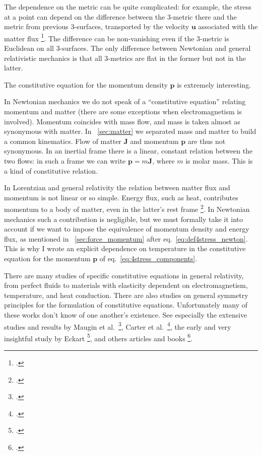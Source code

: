 \documentclass[\ifafour a4paper,12pt,\else a5paper,10pt,\fi%
onecolumn,oneside,article,%
british%
]{memoir}
\theoremstyle{remark}
\theoremstyle{innote}
\newcommand*{\citep}{\footcites}
\renewcommand*{\|}[1][]{\nonscript\,#1\vert\nonscript\;\mathopen{}}
\newcommand*{\eqn}{eq.}%
\newcommand*{\etal}{{et al.}}
\newcommand*{\puzzle}{{\fontencoding{U}\fontfamily{fontawesometwo}\selectfont\symbol{225}}}
\newcommand*{\psect}{{\footnotesize\puzzle}}%
\newcommand*{\ycc}{u}
\newcommand*{\yc}{\bm{\ycc}}
\newcommand*{\yjj}{J}
\newcommand*{\yj}{\bm{\yjj}}
\newcommand*{\ypp}{p}
\newcommand*{\yp}{\bm{\ypp}}
\begin{document}
The dependence on the metric can be quite complicated: for example, the
stress at a point can depend on the difference between the 3-metric there
and the metric from previous 3-surfaces, transported by the velocity $\yc$
associated with the matter flux \citep{grotetal1966,carteretal1972}. The
difference can be non-vanishing even if the 3-metric is Euclidean on all
3-surfaces. The only difference between Newtonian and general relativistic
mechanics is that all 3-metrics are flat in the former but not in the
latter.

\medskip

The constitutive equation for the momentum density $\yp$ is extremely
interesting.

In Newtonian mechanics we do not speak of a \enquote{constitutive equation}
relating momentum and matter (there are some exceptions when
electromagnetism is involved). Momentum coincides with mass flow, and mass
is taken almost as synonymous with matter. In \psect~\ref{sec:matter} we
separated mass and matter to build a common kinematics. Flow of matter
$\yj$ and momentum $\yp$ are thus not synonymous. In an inertial frame
there is a linear, constant relation between the two flows: in such a frame
we can write $\yp = m\yj$, where $m$ is molar mass. This is a kind of
constitutive relation.

In Lorentzian and general relativity the relation between matter flux and
momentum is not linear or so simple. Energy flux, such as heat, contributes
momentum to a body of matter, even in the latter's rest frame
\citep[p.~923]{eckart1940c}. In Newtonian mechanics such a contribution is
negligible, but we must formally take it into account if we want to impose
the equivalence of momentum density and energy flux, as mentioned in
\psect~\ref{sec:force_momentum} after \eqn~\eqref{eq:def4stress_newton}.
This is why I wrote an explicit dependence on temperature in the
constitutive equation for the momentum $\yp$ of
\eqn~\eqref{eq:4stress_components}.

\medskip

There are many studies of specific constitutive equations in general
relativity, from perfect fluids to materials with elasticity dependent on
electromagnetism, temperature, and heat conduction. There are also studies
on general symmetry principles for the formulation of constitutive
equations. Unfortunately many of these works don't know of one another's
existence. See especially the extensive studies and results by Maugin
\etal\
\citep{maugin1971,maugin1971b,mauginetal1972,mauginetal1972b,maugin1973,maugin1974,maugin1974b,maugin1978,maugin1978b,maugin1978c,maugin1978d,maugin1978e},
Carter \etal\ \citep{carteretal1972,carter1973,carteretal2006}, the early
and very insightful study by Eckart \citep{eckart1940c}, and others
articles and books
\citep{bressan1964b,lianis1973,bertottietal1984,hiscocketal1985,anileetal1989,gerochetal1991,herrmannetal2000,bossavit2001b,geroch2001,gourgoulhon2007_r2012,alcubierre2008,choquetbruhat2009,baumgarteetal2010,rezzollaetal2013,disconzi2014,pimenteletal2016,disconzietal2017}.
\end{document}
